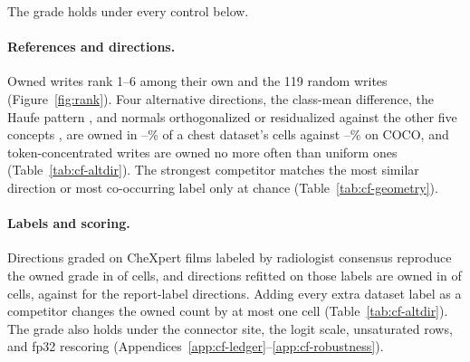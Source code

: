 The grade holds under every control below.

\paragraph{References and directions.} Owned writes rank 1--6 among their own and the 119 random writes (Figure~\ref{fig:rank}). Four alternative directions, the class-mean difference, the Haufe pattern \citep{haufe2014interpretation}, and normals orthogonalized or residualized against the other five concepts \citep{nicolson2025explaining}, are owned in \cfAltdirChestPctMin{}--\cfAltdirChestPctMax\% of a chest dataset's cells against \cfAltdirCocoPctMin{}--\cfAltdirCocoPctMax\% on COCO, and token-concentrated writes are owned no more often than uniform ones (Table~\ref{tab:cf-altdir}). The strongest competitor matches the most similar direction or most co-occurring label only at chance (Table~\ref{tab:cf-geometry}).

\paragraph{Labels and scoring.} Directions graded on \cfValidRows{} CheXpert films labeled by radiologist consensus reproduce the owned grade in \cfValidOwnedAgree{} of \cfValidCells{} cells, and directions refitted on those labels are owned in \cfValidfitOwnedExpert{} of \cfValidfitCells{} cells, against \cfValidfitOwnedReport{} for the report-label directions. Adding every extra dataset label as a competitor changes the owned count by at most one cell (Table~\ref{tab:cf-altdir}). The grade also holds under the connector site, the logit scale, unsaturated rows, and fp32 rescoring (Appendices~\ref{app:cf-ledger}--\ref{app:cf-robustness}).

\FloatBarrier
